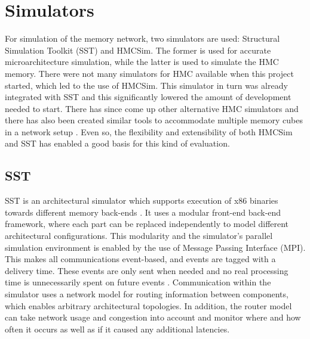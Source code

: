 \section{Simulators}
For simulation of the memory network, two simulators are used: Structural Simulation Toolkit (SST) and HMCSim. The former is used for accurate microarchitecture simulation, while the latter is used to simulate the HMC memory. There were not many simulators for HMC available when this project started, which led to the use of HMCSim. This simulator in turn was already integrated with SST and this significantly lowered the amount of development needed to start. There has since come up other alternative HMC simulators \cite{7544479,Yang:2018:HCH:3240302.3240319} and there has also been created similar tools to accommodate multiple memory cubes in a network setup \cite{Siegl:2017:BAF:3132402.3132403}. Even so, the flexibility and extensibility of both HMCSim and SST has enabled a good basis for this kind of evaluation.
\bigskip

\subsection{SST}
SST is an architectural simulator which supports execution of x86 binaries towards different memory back-ends \cite{rodrigues2011structural}. It uses a modular front-end back-end framework, where each part can be replaced independently to model different architectural configurations. This modularity and the simulator's parallel simulation environment is enabled by the use of Message Passing Interface (MPI). This makes all communications event-based, and events are tagged with a delivery time. These events are only sent when needed and no real processing time is unnecessarily spent on future events \cite{11.1093/comjnl/bxr069}. Communication within the simulator uses a network model for routing information between components, which enables arbitrary architectural topologies. In addition, the router model can take network usage and congestion into account and monitor where and how often it occurs as well as if it caused any additional latencies.
\bigskip

